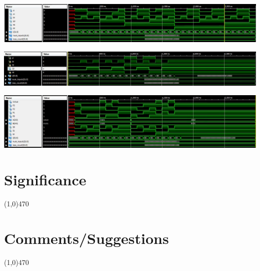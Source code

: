 \documentclass[12pt]{article}
\begin{document}
\begin{center}
	\includegraphics[scale=.33]{logic_ext_tb_wave}
\end{center}

\begin{center}
	\includegraphics[scale=.33]{arith_ext_tb_wave.png}
\end{center}

\begin{center}
	\includegraphics[scale=.33]{alu4bit_tb_wave.png}
\end{center}

			
\section{Significance} \vspace{-.7cm} \line(1,0){470}
	\paragraph{}
		

 \section{Comments/Suggestions}\vspace{-.7cm} \line(1,0){470}
 	\paragraph{}

		
\end{document}
